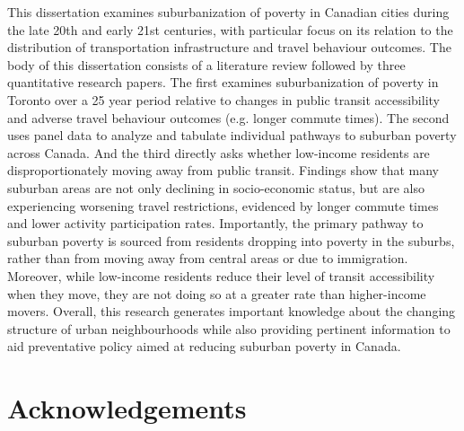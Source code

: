 \documentclass[11 pt, letterpaper]{report}
\begin{document}
This dissertation examines suburbanization of poverty in Canadian cities during the late 20th and early 21st centuries, with particular focus on its relation to the distribution of transportation infrastructure and travel behaviour outcomes. The body of this dissertation consists of a literature review followed by three quantitative research papers. The first examines suburbanization of poverty in Toronto over a 25 year period relative to changes in public transit accessibility and adverse travel behaviour outcomes (e.g. longer commute times). The second uses panel data to analyze and tabulate individual pathways to suburban poverty across Canada. And the third directly asks whether low-income residents are disproportionately moving away from public transit. Findings show that many suburban areas are not only declining in socio-economic status, but are also experiencing worsening travel restrictions, evidenced by longer commute times and lower activity participation rates. Importantly, the primary pathway to suburban poverty is sourced from residents dropping into poverty in the suburbs, rather than from moving away from central areas or due to immigration. Moreover, while low-income residents reduce their level of transit accessibility when they move, they are not doing so at a greater rate than higher-income movers. Overall, this research generates important knowledge about the changing structure of urban neighbourhoods while also providing pertinent information to aid preventative policy aimed at reducing suburban poverty in Canada.





\vspace{12mm}



\newpage


\chapter*{\Large{Acknowledgements}}

\end{document}
